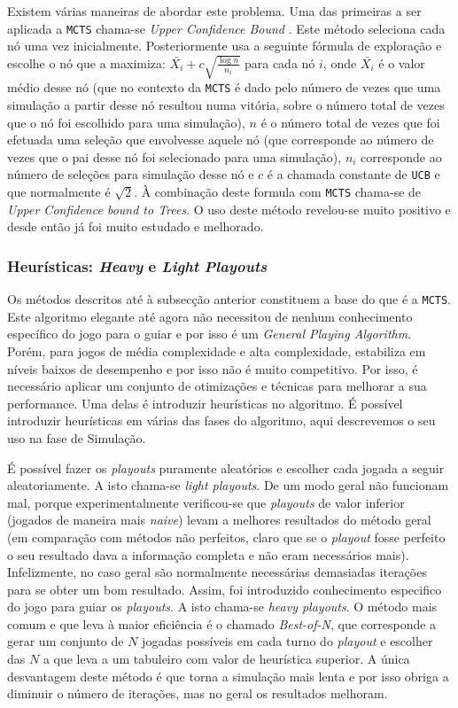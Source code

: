 \documentclass[12pt,a4paper,oneside]{article}
\begin{document}
Existem várias maneiras de abordar este problema. Uma das primeiras a
ser aplicada a \texttt{MCTS} chama-se \textit{Upper Confidence Bound}
\cite{Kocsis:2006}. Este método seleciona cada nó uma vez
inicialmente. Posteriormente usa a seguinte fórmula de exploração e
escolhe o nó que a maximiza: $\bar{X_i} + c
\sqrt{\frac{\log{n}}{n_i}}$ para cada nó $i$, onde $\bar{X_i}$ é o
valor médio desse nó (que no contexto da \texttt{MCTS} é dado pelo
número de vezes que uma simulação a partir desse nó resultou numa
vitória, sobre o número total de vezes que o nó foi escolhido para uma
simulação), $n$ é o número total de vezes que foi efetuada uma seleção
que envolvesse aquele nó (que corresponde ao número de vezes que o pai
desse nó foi selecionado para uma simulação), $n_i$ corresponde ao
número de seleções para simulação desse nó e $c$ é a chamada constante
de \texttt{UCB} e que normalmente é $\sqrt{2}$. À combinação deste
formula com \texttt{MCTS} chama-se de \textit{Upper Confidence bound
  to Trees}. O uso deste método revelou-se muito positivo e desde
então já foi muito estudado e melhorado.

\subsubsection{Heurísticas: \textit{Heavy} e \textit{Light} \textit{Playouts}}

Os métodos descritos até à subsecção anterior constituem a base do que
é a \texttt{MCTS}. Este algoritmo elegante até agora não necessitou de
nenhum conhecimento específico do jogo para o guiar e por isso é um
\textit{General Playing Algorithm}. Porém, para jogos de média
complexidade e alta complexidade, estabiliza em níveis baixos de
desempenho e por isso não é muito competitivo. Por isso, é necessário
aplicar um conjunto de otimizações e técnicas para melhorar a sua
performance. Uma delas é introduzir heurísticas no algoritmo. É
possível introduzir heurísticas em várias das fases do algoritmo, aqui
descrevemos o seu uso na fase de Simulação.

É possível fazer os \textit{playouts} puramente aleatórios e escolher
cada jogada a seguir aleatoriamente. A isto chama-se \textit{light
  playouts}. De um modo geral não funcionam mal, porque
experimentalmente verificou-se que \textit{playouts} de valor inferior
(jogados de maneira mais \textit{naive}) levam a melhores resultados
do método geral (em comparação com métodos não perfeitos, claro que se
o \textit{playout} fosse perfeito o seu resultado dava a informação
completa e não eram necessários mais). Infelizmente, no caso geral são
normalmente necessárias demasiadas iterações para se obter um bom
resultado. Assim, foi introduzido conhecimento especifico do jogo para
guiar os \textit{playouts}. A isto chama-se \textit{heavy playouts}. O
método mais comum e que leva à maior eficiência é o chamado
\textit{Best-of-N}, que corresponde a gerar um conjunto de $N$ jogadas
possíveis em cada turno do \textit{playout} e escolher das $N$ a que
leva a um tabuleiro com valor de heurística superior. A única
desvantagem deste método é que torna a simulação mais lenta e por isso
obriga a diminuir o número de iterações, mas no geral os resultados
melhoram.
\end{document}
